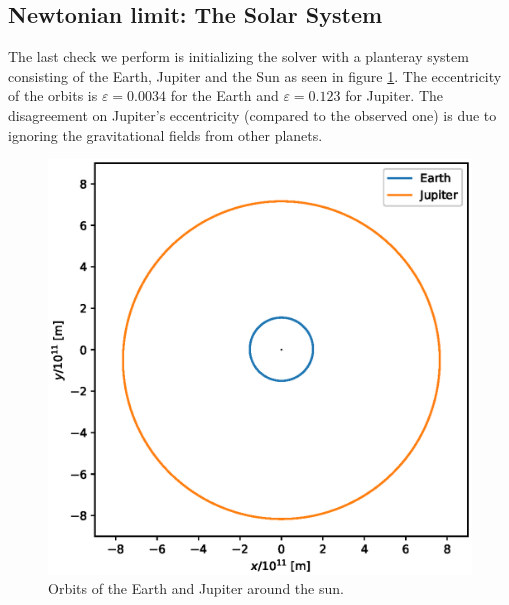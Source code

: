 \documentclass[journal, a4paper]{IEEEtran}
\begin{document}
\subsection{Newtonian limit: The Solar System}
The last check we perform is initializing the solver with a planteray system consisting of the Earth, Jupiter and the Sun as seen in figure \ref{fig::solarsystem}. The eccentricity of the orbits is $\varepsilon = 0.0034$ for the Earth and $\varepsilon=0.123$ for Jupiter. The disagreement on Jupiter's eccentricity (compared to the observed one) is due to ignoring the gravitational fields from other planets. 
\begin{figure}[!hbt]
	\begin{center}
	\includegraphics[width=\columnwidth]{SolarSystem.eps}
	\caption{Orbits of the Earth and Jupiter around the sun.}
	\label{fig::solarsystem}
\end{center}
\end{figure}
\end{document}
